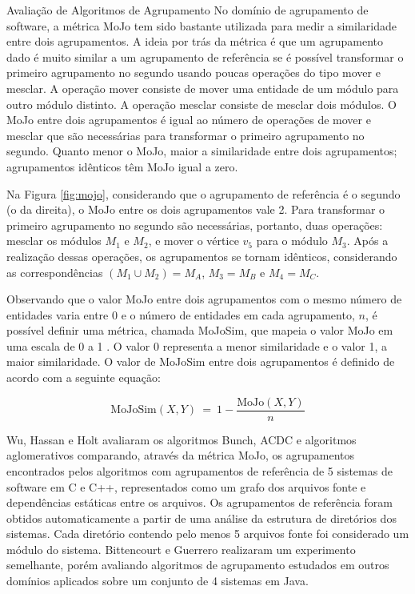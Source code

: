 \begin{section}{Avaliação de Algoritmos de Agrupamento}
No domínio de agrupamento de software, a métrica MoJo \cite{Tzerpos1999} tem sido bastante utilizada para medir a similaridade entre dois agrupamentos. A ideia por trás da métrica é que um agrupamento dado é muito similar a um agrupamento de referência se é possível transformar o primeiro agrupamento no segundo usando poucas operações do tipo mover e mesclar. A operação mover consiste de mover uma entidade de um módulo para outro módulo distinto. A operação mesclar consiste de mesclar dois módulos. O MoJo entre  dois agrupamentos é igual ao número de operações de mover e mesclar que são necessárias para transformar o primeiro agrupamento no segundo. Quanto menor o MoJo, maior a similaridade entre dois agrupamentos; agrupamentos idênticos têm MoJo igual a zero.


Na Figura \ref{fig:mojo}, considerando que o agrupamento de referência é o segundo (o da direita), o MoJo entre os dois agrupamentos vale 2. Para transformar o primeiro agrupamento no segundo são necessárias, portanto, duas operações: mesclar os módulos $M_1$ e $M_2$, e mover o vértice $v_5$ para o módulo $M_3$. Após a realização dessas operações, os agrupamentos se tornam idênticos, considerando as correspondências $(M_1 \cup M_2) = M_A$, $M_3 = M_B$ e $M_4 = M_C$.

Observando que o valor MoJo entre dois agrupamentos com o mesmo número de entidades varia entre 0 e o número de entidades em cada agrupamento, $n$, é possível definir uma métrica, chamada MoJoSim, que mapeia o valor MoJo em uma escala de 0 a 1 \cite{Bittencourt2009}. O valor 0 representa a menor similaridade e o valor 1, a maior similaridade. O valor de MoJoSim entre dois agrupamentos é definido de acordo com a seguinte equação:

$$
\mathrm{MoJoSim}(X, Y) ~=~ 1 - \frac{\mathrm{MoJo}(X, Y)}{n}
$$


Wu, Hassan e Holt \cite{Wu2005} avaliaram os algoritmos Bunch, ACDC e algoritmos aglomerativos comparando, através da métrica MoJo, os agrupamentos encontrados pelos algoritmos com agrupamentos de referência de 5 sistemas de software em C e C++, representados como um grafo dos arquivos fonte e dependências estáticas entre os arquivos. Os agrupamentos de referência foram obtidos automaticamente a partir de uma análise da estrutura de diretórios dos sistemas. Cada diretório contendo pelo menos 5 arquivos fonte foi considerado um módulo do sistema. Bittencourt e Guerrero \cite{Bittencourt2009} realizaram um experimento semelhante, porém avaliando algoritmos de agrupamento estudados em outros domínios aplicados sobre um conjunto de 4 sistemas em Java.

\end{section}


